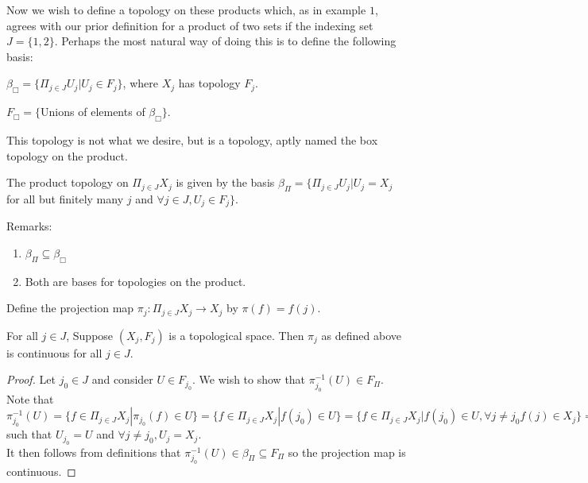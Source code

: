 Now we wish to define a topology on these products which, as in example $1$, agrees with our prior definition for a product of two sets if the indexing set $J = \{1,2\}$. Perhaps the most natural way of doing this is to define the following basis: 
\begin{center}
	$\beta_{\Box} = \{\Pi_{j \in J} U_j|U_j \in F_j\}$, where $X_j$ has topology $F_j$.
	
	$F_{\Box} = \{$Unions of elements of $\beta_{\Box}\}.$ 
\end{center}
This topology is not what we desire, but is a topology, aptly named the box topology on the product. 
\begin{example}
	The product topology on $\Pi_{j \in J}X_j$ is given by the basis $\beta_{\Pi} = \{\Pi_{j \in J}U_j|U_j = X_j$ for all but finitely many $j$ and $\forall j \in J, U_j \in F_j \}$. 
\end{example}

Remarks: 
\begin{enumerate}
	\item $\beta_{\Pi} \subseteq \beta_{\Box}$ 
	\item Both are bases for topologies on the product. 
\end{enumerate}
\begin{definition}
	Define the projection map $\pi_j : \Pi_{j \in J}X_j \rightarrow X_j$ by $\pi(f) = f(j)$. 
\end{definition}
\begin{lemma}
	For all $j \in J$, Suppose $(X_j, F_j)$ is a topological space. Then $\pi_j$ as defined above is continuous for all $j \in J$. 
\end{lemma}
\begin{proof}
	Let $j_{0} \in J$ and consider $U \in F_{j_{0}}$. We wish to show that $\pi_{j_{0}}^{-1}(U) \in F_{\Pi}$. Note that $\pi_{j_{0}}^{-1}(U) = \{f \in \Pi_{j \in J}X_j | \pi_{j_{0}}(f) \in U\} = \{f \in \Pi_{j \in J}X_j | f(j_{0}) \in U\} = \{f \in \Pi_{j \in J}X_j | f(j_{0}) \in U, \forall j \neq j_{0} f(j) \in X_{j}\}= \Pi_{j \in J} U_j$ such that $U_{j_{0}} = U$ and $\forall j \neq j_{0}, U_j = X_j$.\\
	It then follows from definitions that $\pi_{j_{0}}^{-1}(U) \in \beta_{\Pi} \subseteq F_{\Pi}$ so the projection map is continuous. 
\end{proof}

